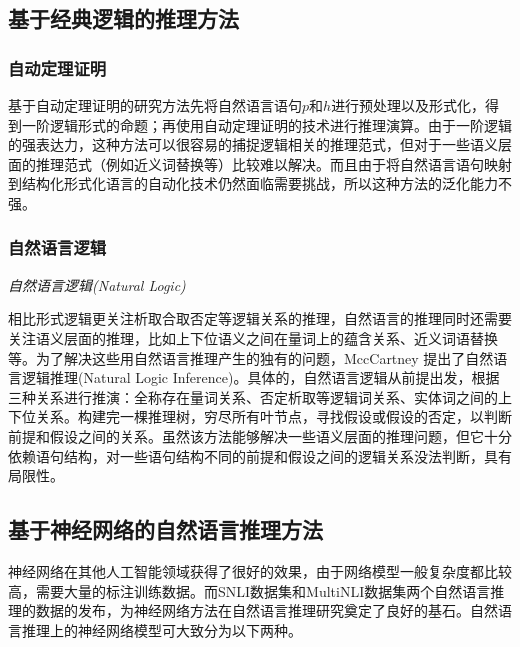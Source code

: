 \documentclass[UTF8,11pt,a4paper,nofonts]{ctexart}
\begin{document}
\subsection{基于经典逻辑的推理方法}

\subsubsection{自动定理证明}

基于自动定理证明的研究方法\cite{Bos2005RecognisingTE, Abzianidze2017APL}先将自然语言语句$p$和$h$进行预处理以及形式化，得到一阶逻辑形式的命题；再使用自动定理证明\cite{Chang1973SymbolicLA}的技术进行推理演算。由于一阶逻辑的强表达力，这种方法可以很容易的捕捉逻辑相关的推理范式，但对于一些语义层面的推理范式（例如近义词替换等）比较难以解决。而且由于将自然语言语句映射到结构化形式化语言的自动化技术仍然面临需要挑战，所以这种方法的泛化能力不强。

\subsubsection{自然语言逻辑}

\textit{自然语言逻辑(Natural Logic)}

相比形式逻辑更关注析取合取否定等逻辑关系的推理，自然语言的推理同时还需要关注语义层面的推理，比如上下位语义之间在量词上的蕴含关系、近义词语替换等。为了解决这些用自然语言推理产生的独有的问题，MccCartney 提出了自然语言逻辑推理(Natural Logic Inference)\cite{MacCartney2007NaturalLF, Angeli2014NaturalLINL, }。具体的，自然语言逻辑从前提出发，根据三种关系进行推演：全称存在量词关系、否定析取等逻辑词关系、实体词之间的上下位关系。构建完一棵推理树，穷尽所有叶节点，寻找假设或假设的否定，以判断前提和假设之间的关系。虽然该方法能够解决一些语义层面的推理问题，但它十分依赖语句结构，对一些语句结构不同的前提和假设之间的逻辑关系没法判断，具有局限性。




\subsection{基于神经网络的自然语言推理方法}

神经网络在其他人工智能领域获得了很好的效果，由于网络模型一般复杂度都比较高，需要大量的标注训练数据。而SNLI数据集\cite{Bowman2015ALA}和MultiNLI数据集\cite{Nangia2017TheR2}两个自然语言推理的数据的发布，为神经网络方法在自然语言推理研究奠定了良好的基石。自然语言推理上的神经网络模型可大致分为以下两种。
\end{document}
